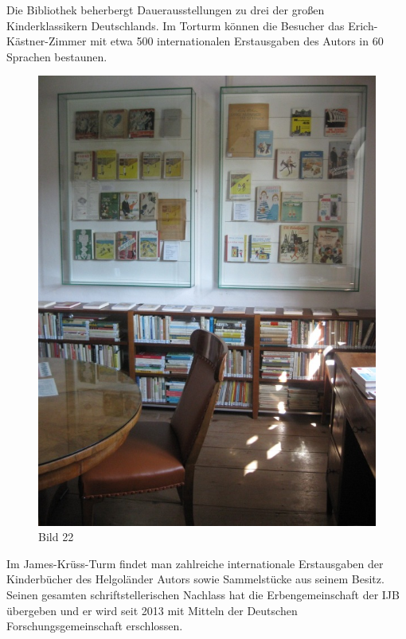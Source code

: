 \documentclass[a4paper,
fontsize=11pt,
oneside,
numbers=noperiodatend,
parskip=half-,
bibliography=totoc,
final
]{scrartcl}
\begin{document}
Die Bibliothek beherbergt Dauerausstellungen zu drei der großen
Kinderklassikern Deutschlands. Im Torturm können die Besucher das
Erich-Kästner-Zimmer mit etwa 500 internationalen Erstausgaben des
Autors in 60 Sprachen bestaunen.

\begin{figure}[htbp]
\centering
\includegraphics{img/Bild22.jpg}
\caption{Bild 22}
\end{figure}

Im James-Krüss-Turm findet man zahlreiche internationale Erstausgaben
der Kinderbücher des Helgoländer Autors sowie Sammelstücke aus seinem
Besitz. Seinen gesamten schriftstellerischen Nachlass hat die
Erbengemeinschaft der IJB übergeben und er wird seit 2013 mit Mitteln
der Deutschen Forschungsgemeinschaft erschlossen.
\end{document}
